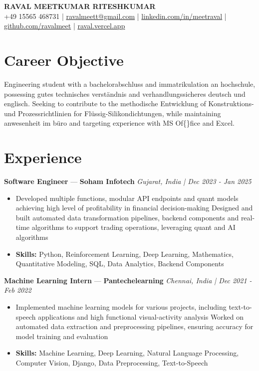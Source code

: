 \documentclass[a4paper,10pt]{article}
\begin{document}
\begin{center}
  {\Large\bfseries RAVAL MEETKUMAR RITESHKUMAR}\\[2pt]
  {\small +49 15565 468731 \;|\; \href{mailto:ravalmeett@gmail.com}{ravalmeett@gmail.com} \;|\; \href{https://www.linkedin.com/in/meetraval/}{linkedin.com/in/meetraval} \;|\; \href{https://github.com/ravalmeet}{github.com/ravalmeet} \;|\; \href{https://raval.vercel.app/}{raval.vercel.app}}
\end{center}
\vspace{-3pt}

\section*{Career Objective}
Engineering student with a bachelorabschluss and immatrikulation an hochschule, possessing gutes technisches verständnis and verhandlungssicheres deutsch und englisch. Seeking to contribute to the methodische Entwicklung of Konstruktions- und Prozessrichtlinien for Flüssig-Silikondichtungen, while maintaining anwesenheit im büro and targeting experience with MS Of\{\}fice and Excel.\par

\section*{Experience}
\textbf{Software Engineer} — \textbf{Soham Infotech} \hfill \textit{Gujarat, India \;|\; Dec 2023 - Jan 2025}\par
\vspace{1pt}
\begin{itemize}
  \item Developed multiple functions, modular API endpoints and quant models achieving high level of profitability in financial decision-making Designed and built automated data transformation pipelines, backend components and real-time algorithms to support trading operations, leveraging quant and AI algorithms
  \item \textbf{Skills:} Python, Reinforcement Learning, Deep Learning, Mathematics, Quantitative Modeling, SQL, Data Analytics, Backend Components
\end{itemize}
\vspace{3pt}
\textbf{Machine Learning Intern} — \textbf{Pantechelearning} \hfill \textit{Chennai, India \;|\; Dec 2021 - Feb 2022}\par
\vspace{1pt}
\begin{itemize}
  \item Implemented machine learning models for various projects, including text-to-speech applications and high functional visual-activity analysis Worked on automated data extraction and preprocessing pipelines, ensuring accuracy for model training and evaluation
  \item \textbf{Skills:} Machine Learning, Deep Learning, Natural Language Processing, Computer Vision, Django, Data Preprocessing, Text-to-Speech
\end{itemize}
\end{document}
